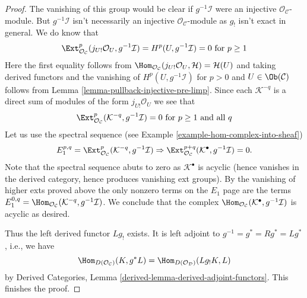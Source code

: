 \begin{proof}
\medskip\noindent
The vanishing of this group would be clear if $g^{-1}\mathcal{I}$
were an injective $\mathcal{O}_\mathcal{C}$-module. But
$g^{-1}\mathcal{I}$ isn't necessarily an injective
$\mathcal{O}_\mathcal{C}$-module as $g_!$ isn't exact in
general. We do know that
$$
\Ext^p_{\mathcal{O}_\mathcal{C}}(
j_{U!}\mathcal{O}_U, g^{-1}\mathcal{I}) =
H^p(U, g^{-1}\mathcal{I}) = 0 \text{ for }p \geq 1
$$
Here the first equality follows from
$\Hom_{\mathcal{O}_\mathcal{C}}(j_{U!}\mathcal{O}_U, \mathcal{H}) =
\mathcal{H}(U)$ and taking derived functors and the vanishing of
$H^p(U, g^{-1}\mathcal{I})$ for $p > 0$ and $U \in \Ob(\mathcal{C})$
follows from Lemma \ref{lemma-pullback-injective-pre-limp}.
Since each $\mathcal{K}^{-q}$ is a direct sum of modules of the form
$j_{U!}\mathcal{O}_U$ we see that
$$
\Ext^p_{\mathcal{O}_\mathcal{C}}(\mathcal{K}^{-q}, g^{-1}\mathcal{I}) = 0
\text{ for }p \geq 1\text{ and all }q
$$
Let us use the spectral sequence (see
Example
\ref{example-hom-complex-into-sheaf})
$$
E_1^{p, q} = \Ext^p_{\mathcal{O}_\mathcal{C}}(
\mathcal{K}^{-q}, g^{-1}\mathcal{I})
\Rightarrow
\Ext^{p + q}_{\mathcal{O}_\mathcal{C}}(
\mathcal{K}^\bullet, g^{-1}\mathcal{I}) = 0.
$$
Note that the spectral sequence abuts to zero as $\mathcal{K}^\bullet$
is acyclic (hence vanishes in the derived category, hence produces
vanishing ext groups). By the vanishing of higher exts proved above
the only nonzero terms on the $E_1$ page are the terms
$E_1^{0, q} = \Hom_{\mathcal{O}_\mathcal{C}}(
\mathcal{K}^{-q}, g^{-1}\mathcal{I})$.
We conclude that the complex
$\Hom_{\mathcal{O}_\mathcal{C}}(
\mathcal{K}^\bullet, g^{-1}\mathcal{I})$
is acyclic as desired.

\medskip\noindent
Thus the left derived functor $Lg_!$ exists.
It is left adjoint to $g^{-1} = g^* = Rg^* = Lg^*$, i.e., we have
\begin{equation}
\label{equation-to-prove}
\Hom_{D(\mathcal{O}_\mathcal{C})}(K, g^*L) =
\Hom_{D(\mathcal{O}_\mathcal{D})}(Lg_!K, L)
\end{equation}
by Derived Categories, Lemma \ref{derived-lemma-derived-adjoint-functors}.
This finishes the proof.
\end{proof}

